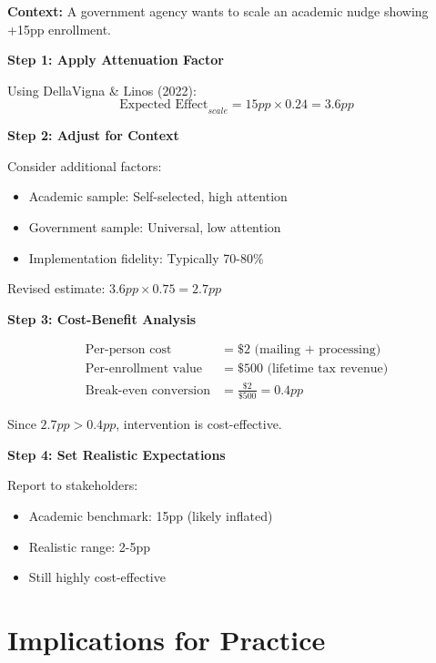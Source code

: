 \begin{tcolorbox}[colback=blue!5!white,colframe=blue!75!black,title=Application: Scaling a Retirement Savings Nudge]
\textbf{Context:} A government agency wants to scale an academic nudge showing +15pp enrollment.

\textbf{Step 1: Apply Attenuation Factor}

Using DellaVigna \& Linos (2022):
\begin{equation}
\text{Expected Effect}_{scale} = 15pp \times 0.24 = 3.6pp
\end{equation}

\textbf{Step 2: Adjust for Context}

Consider additional factors:
\begin{itemize}
    \item Academic sample: Self-selected, high attention
    \item Government sample: Universal, low attention
    \item Implementation fidelity: Typically 70-80\%
\end{itemize}

Revised estimate: $3.6pp \times 0.75 = 2.7pp$

\textbf{Step 3: Cost-Benefit Analysis}

\begin{align}
\text{Per-person cost} &= \$2 \text{ (mailing + processing)} \\
\text{Per-enrollment value} &= \$500 \text{ (lifetime tax revenue)} \\
\text{Break-even conversion} &= \frac{\$2}{\$500} = 0.4pp
\end{align}

Since $2.7pp > 0.4pp$, intervention is cost-effective.

\textbf{Step 4: Set Realistic Expectations}

Report to stakeholders:
\begin{itemize}
    \item Academic benchmark: 15pp (likely inflated)
    \item Realistic range: 2-5pp
    \item Still highly cost-effective
\end{itemize}
\end{tcolorbox}

\section{Implications for Practice}

